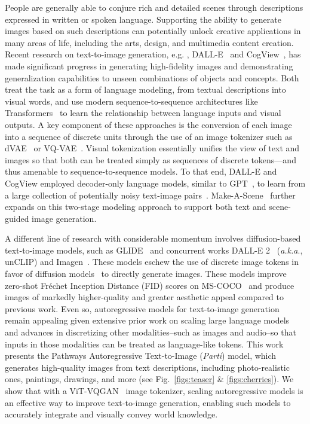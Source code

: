 People are generally able to conjure rich and detailed scenes through descriptions expressed in written or spoken language. Supporting the ability to generate images based on such descriptions can potentially unlock creative applications in many areas of life, including the arts, design, and multimedia content creation. Recent research on text-to-image generation, e.g. , DALL-E~\cite{ramesh2021zero} and CogView~\cite{ding2021cogview}, has made significant progress in generating high-fidelity images and demonstrating generalization capabilities to unseen combinations of objects and concepts. Both treat the task as a form of language modeling, from textual descriptions into visual words, and use modern sequence-to-sequence architectures like Transformers~\cite{vaswani2017attention} to learn the relationship between language inputs and visual outputs. A key component of these approaches is the conversion of each image into a sequence of discrete units through the use of an image tokenizer such as dVAE~\cite{rolfe2016discrete} or VQ-VAE~\cite{van2017neural}. Visual tokenization essentially unifies the view of text and images so that both can be treated simply as sequences of discrete tokens---and thus amenable to sequence-to-sequence models. To that end, DALL-E and CogView employed decoder-only language models, similar to GPT~\cite{radford2018improving}, to learn from a large collection of potentially noisy text-image pairs~\cite{changpinyo2021cc12m, align-paper}. Make-A-Scene~\cite{gafni2022make} further expands on this two-stage modeling approach to support both text and scene-guided image generation.

A different line of research with considerable momentum involves diffusion-based text-to-image models, such as GLIDE~\cite{nichol2021glide} and concurrent works DALL-E 2~\cite{ramesh2022hierarchical} (\emph{a.k.a}., unCLIP) and Imagen~\cite{imagen}. These models eschew the use of discrete image tokens in favor of diffusion models~\cite{ho2020denoising, dhariwal2021diffusion} to directly generate images. These models improve zero-shot Fr\'echet Inception Distance (FID) scores on MS-COCO~\cite{lin2014microsoft} and produce images of markedly higher-quality and greater aesthetic appeal compared to previous work. Even so, autoregressive models for text-to-image generation remain appealing given extensive prior work on scaling large language models~\cite{gpt3, lamda, du2021glam, palm} and advances in discretizing other modalities--such as images and audio--so that inputs in those modalities can be treated as language-like tokens. This work presents the Pathways Autoregressive Text-to-Image (\textit{Parti}) model, which generates high-quality images from text descriptions, including photo-realistic ones, paintings, drawings, and more (see Fig.\ \ref{figs:teaser} \& \ref{figs:cherries}). We show that with a ViT-VQGAN~\cite{yu2021vector} image tokenizer, scaling autoregressive models is an effective way to improve text-to-image generation, enabling such models to accurately integrate and visually convey world knowledge.

